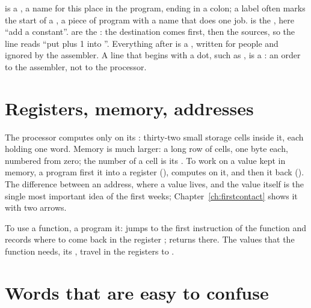 \noindent {} is a , a name for this place in the
program, ending in a colon; a label often marks the start of a
, a piece of program with a name that does one job.
 is the , here ``add a constant''. 
are the : the destination comes first, then the sources, so the
line reads ``put  plus 1 into ''. Everything after \code{\#} is
a , written for people and ignored by the assembler. A line that
begins with a dot, such as , is a : an
order to the assembler, not to the processor.

\section*{Registers, memory, addresses}

The processor computes only on its : thirty-two small storage
cells inside it, each holding one word. Memory is much larger: a long row of
cells, one byte each, numbered from zero; the number of a cell is its
. To work on a value kept in memory, a program first
 it into a register (), computes on it, and then
 it back (). The difference between an address, where a
value lives, and the value itself is the single most important idea of the
first weeks; Chapter~\ref{ch:firstcontact} shows it with two arrows.

To use a function, a program  it:  jumps to the first
instruction of the function and records where to come back in the register
;  returns there. The values that the function needs, its
, travel in the registers  to .

\section*{Words that are easy to confuse}

